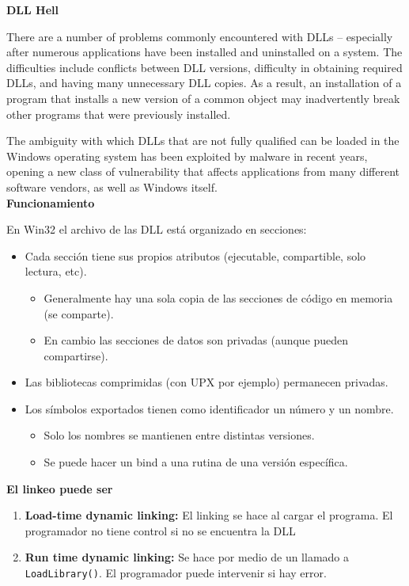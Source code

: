 \documentclass[a4paper, twoside]{article}
\begin{document}
\textbf{DLL Hell}

There are a number of problems commonly encountered with DLLs – especially after numerous applications have been installed and uninstalled on a system. The difficulties include conflicts between DLL versions, difficulty in obtaining required DLLs, and having many unnecessary DLL copies. As a result, an installation of a program that installs a new version of a common object may inadvertently break other programs that were previously installed.

The ambiguity with which DLLs that are not fully qualified can be loaded in the Windows operating system has been exploited by malware in recent years, opening a new class of vulnerability that affects applications from many different software vendors, as well as Windows itself.\\

\textbf{Funcionamiento}

En Win32 el archivo de las DLL está organizado en secciones:
\begin{itemize}
	\item Cada sección tiene sus propios atributos (ejecutable, compartible, solo lectura, etc).
	\begin{itemize}
		\item Generalmente hay una sola copia de las secciones de código en memoria (se comparte).
		\item En cambio las secciones de datos son privadas (aunque pueden compartirse).
	\end{itemize}
	\item Las bibliotecas comprimidas (con UPX por ejemplo) permanecen privadas.
	\item Los símbolos exportados tienen como identificador un número y un nombre.
	\begin{itemize}
		\item Solo los nombres se mantienen entre distintas versiones.
		\item Se puede hacer un bind a una rutina de una versión específica.
	\end{itemize}
\end{itemize}

\textbf{El linkeo puede ser}
\begin{enumerate}
	\item \textbf{Load-time dynamic linking:} El linking se hace al cargar el programa. El programador no tiene control si no se encuentra la DLL
	\item \textbf{Run time dynamic linking:} Se hace por medio de un llamado a \texttt{LoadLibrary()}. El programador puede intervenir si hay error.
\end{enumerate}
\end{document}
